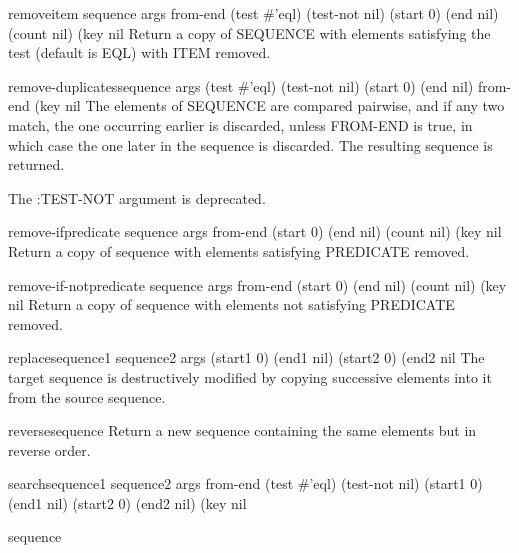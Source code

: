 \begin{function}{remove}{item sequence \rest args \key from-end (test #'eql) (test-not nil) (start 0)
 (end nil) (count nil) (key nil}{}
  Return a copy of SEQUENCE with elements satisfying the test (default is
   EQL) with ITEM removed.
\end{function}

\begin{function}{remove-duplicates}{sequence \rest args \key (test #'eql) (test-not nil) (start 0) (end nil)
 from-end (key nil}{}
  The elements of SEQUENCE are compared pairwise, and if any two match,
   the one occurring earlier is discarded, unless FROM-END is true, in
   which case the one later in the sequence is discarded. The resulting
   sequence is returned.

   The :TEST-NOT argument is deprecated.
\end{function}

\begin{function}{remove-if}{predicate sequence \rest args \key from-end (start 0) (end nil) (count nil)
 (key nil}{}
  Return a copy of sequence with elements satisfying PREDICATE removed.
\end{function}

\begin{function}{remove-if-not}{predicate sequence \rest args \key from-end (start 0) (end nil) (count nil)
 (key nil}{}
  Return a copy of sequence with elements not satisfying PREDICATE removed.
\end{function}

\begin{function}{replace}{sequence1 sequence2 \rest args \key (start1 0) (end1 nil) (start2 0)
 (end2 nil}{}
  The target sequence is destructively modified by copying successive
   elements into it from the source sequence.
\end{function}

\begin{function}{reverse}{sequence}{}
  Return a new sequence containing the same elements but in reverse order.
\end{function}

\begin{function}{search}{sequence1 sequence2 \rest args \key from-end (test #'eql) (test-not nil)
 (start1 0) (end1 nil) (start2 0) (end2 nil) (key nil}{}
  
\end{function}

\begin{class}{sequence}{}{}
  
\end{class}

